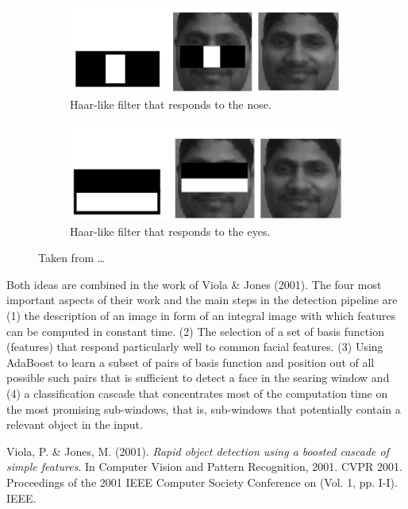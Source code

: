 \documentclass[11pt,a4paper]{article}
\begin{document}
\begin{figure}[t!]
    \centering
    \begin{subfigure}[b]{.49\linewidth}
        \includegraphics[width=\linewidth]{figures/Haar_Feature_that_looks_similar_to_the_bridge_of_the_nose_is_applied_onto_the_face.jpg}
        \caption{Haar-like filter that responds to the nose.}
        \label{fig:<+label+>}
    \end{subfigure}
    \begin{subfigure}[b]{.49\linewidth}
        \includegraphics[width=\linewidth]{figures/Haar_Feature_that_looks_similar_to_the_eye_region_which_is_darker_than_the_upper_cheeks_is_applied_onto_a_face.jpg}
        \caption{Haar-like filter that responds to the eyes.}
        \label{fig:<+label+>}
    \end{subfigure}
    \caption{Taken from \ldots}
    \label{fig:haar-filter}
\end{figure}

Both ideas are combined in the work of Viola \& Jones (2001)\cite{ViolaJones2001}. The four most important aspects of their work and the main steps in the detection pipeline are (1) the description of an image in form of an integral image with which features can be computed in constant time. (2) The selection of a set of basis function (features) that respond particularly well to common facial features. (3) Using AdaBoost to learn a subset of pairs of basis function and position out of all possible such pairs that is sufficient to detect a face in the searing window and (4) a classification cascade that concentrates most of the computation time on the most promising sub-windows, that is, sub-windows that potentially contain a relevant object in the input.

\begin{thebibliography}{9}

    Viola, P. \& Jones, M. (2001). \emph{Rapid object detection using a boosted cascade of simple features}. In Computer Vision and Pattern Recognition, 2001. CVPR 2001. Proceedings of the 2001 IEEE Computer Society Conference on (Vol. 1, pp. I-I). IEEE.

\end{thebibliography}
\end{document}
